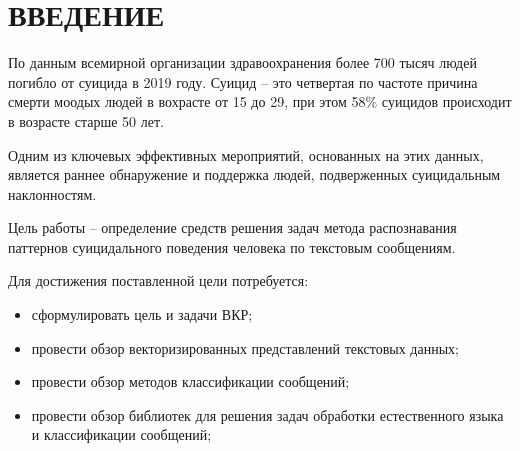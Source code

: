 \section*{ВВЕДЕНИЕ}

По данным всемирной организации здравоохранения более 700 тысяч людей погибло от суицида в 2019 году. Суицид -- это четвертая по частоте причина смерти моодых людей в вохрасте от 15 до 29, при этом 58\% суицидов происходит в возрасте старше 50 лет. \cite{suicideVOZ}

Одним из ключевых эффективных мероприятий, основанных на этих данных, является раннее обнаружение и поддержка людей, подверженных суицидальным наклонностям.

Цель работы -- определение средств решения задач метода распознавания паттернов суицидального поведения человека по текстовым сообщениям.

Для достижения поставленной цели потребуется:
\begin{itemize}
	\item сформулировать цель и задачи ВКР;
	\item провести обзор векторизированных представлений текстовых данных;
	\item провести обзор методов классификации сообщений;
	\item провести обзор библиотек для решения задач обработки естественного языка и классификации сообщений;
\end{itemize}

\pagebreak